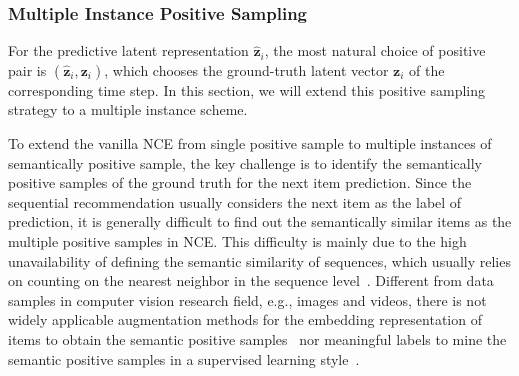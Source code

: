 \documentclass[conference]{IEEEtran}
\begin{document}
\subsubsection{Multiple Instance Positive Sampling}
\label{sec:pos}
For the predictive latent representation $\hat{\mathbf{z}}_i$, the most natural choice of positive pair is $\left(\hat{\mathbf{z}}_i,\mathbf{z}_i\right)$, which chooses the ground-truth latent vector $\mathbf{z}_i$ of the corresponding time step. In this section, we will extend this positive sampling strategy to a multiple instance scheme.

To extend the vanilla NCE from single positive sample to multiple instances of semantically positive sample, the key challenge is to identify the semantically positive samples of the ground truth for the next item prediction. Since the sequential recommendation usually considers the next item as the label of prediction, it is generally difficult to find out the semantically similar items as the multiple positive samples in NCE. This difficulty is mainly due to the high unavailability of defining the semantic similarity of sequences, which usually relies on counting on the nearest neighbor in the sequence level~\cite{stan}. Different from data samples in computer vision research field, e.g., images and videos, there is not widely applicable augmentation methods for the embedding representation of items to obtain the semantic positive samples~\cite{moco,simclr} nor meaningful labels to mine the semantic positive samples in a supervised learning style~\cite{scl,milnce}.
\end{document}

